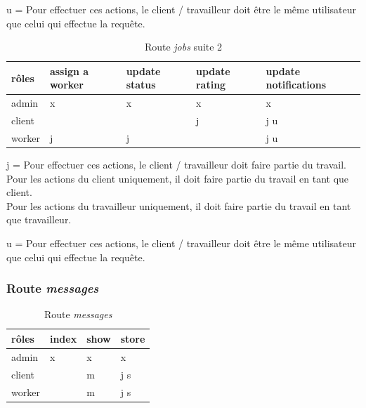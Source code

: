 \documentclass[
    iai, %
    il, %
]{heig-tb}
\begin{document}
u = Pour effectuer ces actions, le client / travailleur doit être le même utilisateur que celui qui effectue la requête.

\begin{table}[h]
    \begin{center}
        \caption{Route \emph{jobs} suite 2\label{autorisations-route-jobs-updates}}
        \begin{tabularx}{1.0\textwidth} {X|X|X|X|X}
            rôles  & assign a worker & update status & update rating & update notifications \\ \hline
            admin  & x               & x             & x             & x                    \\
            client &                 &               & j             & j u                  \\
            worker & j               & j             &               & j u                  \\
        \end{tabularx}
    \end{center}
\end{table}

j = Pour effectuer ces actions, le client / travailleur doit faire partie du travail. \\
Pour les actions du client uniquement, il doit faire partie du travail en tant que client. \\
Pour les actions du travailleur uniquement, il doit faire partie du travail en tant que travailleur.

u = Pour effectuer ces actions, le client / travailleur doit être le même utilisateur que celui qui effectue la requête.

\subsubsection{Route \emph{messages}}

\begin{table}[h]
    \begin{center}
        \caption{Route \emph{messages} \label{autorisations-route-messages}}
        \begin{tabularx}{1.0\textwidth} {X|X|X|X}
            rôles  & index & show & store \\ \hline
            admin  & x     & x    & x     \\
            client &       & m    & j s   \\
            worker &       & m    & j s   \\
        \end{tabularx}
    \end{center}
\end{table}
\end{document}
